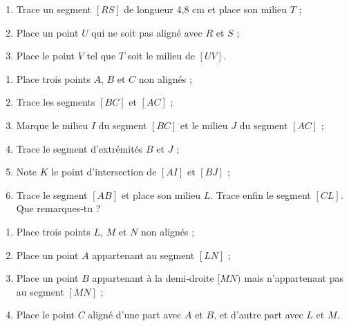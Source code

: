 \begin{exercice}[Milieux]
\begin{enumerate} 
 \item Trace un segment $[RS]$ de longueur 4,8 cm et place son milieu $T$ ;
 \item Place un point $U$ qui ne soit pas aligné avec $R$ et $S$ ;
 \item Place le point $V$ tel que $T$ soit le milieu de $[UV]$.
 \end{enumerate}
\end{exercice}


\begin{exercice}[À construire]
\begin{enumerate} 
 \item Place trois points $A$, $B$ et $C$ non alignés ;
 \item Trace les segments $[BC]$ et $[AC]$ ;
 \item Marque le milieu $I$ du segment $[BC]$ et le milieu $J$ du segment $[AC]$ ;
 \item Trace le segment d'extrémités $B$ et $J$ ;
 \item Note $K$ le point d'intersection de $[AI]$ et $[BJ]$ ;
 \item Trace le segment $[AB]$ et place son milieu $L$. Trace enfin le segment $[CL]$. Que remarques‑tu ?
 \end{enumerate}
\end{exercice}


\begin{exercice}
\begin{enumerate} 
 \item Place trois points $L$, $M$ et $N$ non alignés ;
 \item Place un point $A$ appartenant au segment $[LN]$ ;
 \item Place un point $B$ appartenant à la demi‑droite $[MN)$ mais n'appartenant pas au segment $[MN]$ ;
 \item Place le point $C$ aligné d'une part avec $A$ et $B$, et d'autre part avec $L$ et $M$.
 \end{enumerate}
\end{exercice}



\vspace{1em}




